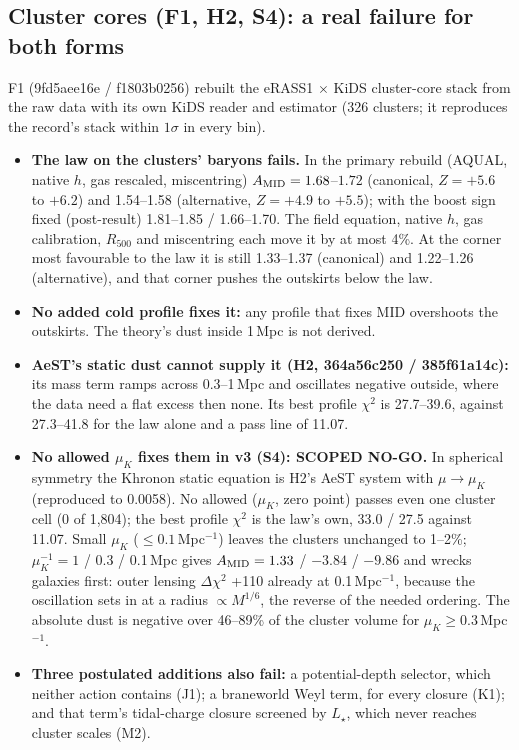 \documentclass[10pt]{article}
\begin{document}
\subsection{Cluster cores (F1, H2, S4): a real failure for both forms}
F1 (9fd5aee16e / f1803b0256) rebuilt the eRASS1 $\times$ KiDS cluster-core stack from the raw data with its own KiDS reader and estimator (326 clusters; it reproduces the record's stack within $1\sigma$ in every bin).
\begin{itemize}
\item \textbf{The law on the clusters' baryons fails.} In the primary rebuild (AQUAL, native $h$, gas rescaled, miscentring) $A_{\rm MID}=1.68$--$1.72$ (canonical, $Z=+5.6$ to $+6.2$) and 1.54--1.58 (alternative, $Z=+4.9$ to $+5.5$); with the boost sign fixed (post-result) 1.81--1.85 / 1.66--1.70. The field equation, native $h$, gas calibration, $R_{500}$ and miscentring each move it by at most 4\%. At the corner most favourable to the law it is still 1.33--1.37 (canonical) and 1.22--1.26 (alternative), and that corner pushes the outskirts below the law.
\item \textbf{No added cold profile fixes it:} any profile that fixes MID overshoots the outskirts. The theory's dust inside 1\,Mpc is not derived.
\item \textbf{AeST's static dust cannot supply it (H2, 364a56c250 / 385f61a14c):} its mass term ramps across 0.3--1\,Mpc and oscillates negative outside, where the data need a flat excess then none. Its best profile $\chi^2$ is 27.7--39.6, against 27.3--41.8 for the law alone and a pass line of 11.07.
\item \textbf{No allowed $\mu_K$ fixes them in v3 (S4): SCOPED NO-GO.} In spherical symmetry the Khronon static equation is H2's AeST system with $\mu\to\mu_K$ (reproduced to 0.0058). No allowed ($\mu_K$, zero point) passes even one cluster cell (0 of 1,804); the best profile $\chi^2$ is the law's own, 33.0 / 27.5 against 11.07. Small $\mu_K$ ($\le0.1$\,Mpc$^{-1}$) leaves the clusters unchanged to 1--2\%; $\mu_K^{-1}=1$ / 0.3 / 0.1\,Mpc gives $A_{\rm MID}=1.33$ / $-3.84$ / $-9.86$ and wrecks galaxies first: outer lensing $\Delta\chi^2$ +110 already at 0.1\,Mpc$^{-1}$, because the oscillation sets in at a radius $\propto M^{1/6}$, the reverse of the needed ordering. The absolute dust is negative over 46--89\% of the cluster volume for $\mu_K\ge0.3$\,Mpc$^{-1}$.
\item \textbf{Three postulated additions also fail:} a potential-depth selector, which neither action contains (J1); a braneworld Weyl term, for every closure (K1); and that term's tidal-charge closure screened by $L_\star$, which never reaches cluster scales (M2).
\end{itemize}
\end{document}
